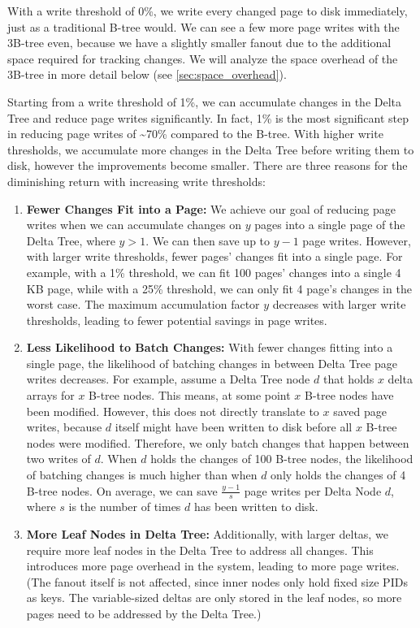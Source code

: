 With a write threshold of 0\%, we write every changed page to disk immediately, just as a traditional B-tree would.
We can see a few more page writes with the 3B-tree even, because we have a slightly smaller fanout due to the additional space required for tracking changes.
We will analyze the space overhead of the 3B-tree in more detail below (see \autoref{sec:space_overhead}).

Starting from a write threshold of 1\%, we can accumulate changes in the Delta Tree and reduce page writes significantly.
In fact, 1\% is the most significant step in reducing page writes of \textasciitilde70\% compared to the B-tree.
With higher write thresholds, we accumulate more changes in the Delta Tree before writing them to disk, however the improvements become smaller.
There are three reasons for the diminishing return with increasing write thresholds:
\begin{enumerate}
\item \textbf{Fewer Changes Fit into a Page:} 
We achieve our goal of reducing page writes when we can accumulate changes on $y$ pages into a single page of the Delta Tree, where $y > 1$.
We can then save up to $y - 1$ page writes.
However, with larger write thresholds, fewer pages' changes fit into a single page.
For example, with a 1\% threshold, we can fit 100 pages' changes into a single 4 KB page, while with a 25\% threshold, we can only fit 4 page's changes in the worst case.
The maximum accumulation factor $y$ decreases with larger write thresholds, leading to fewer potential savings in page writes.
\item \textbf{Less Likelihood to Batch Changes:}
With fewer changes fitting into a single page, the likelihood of batching changes in between Delta Tree page writes decreases.
For example, assume a Delta Tree node $d$ that holds $x$ delta arrays for $x$ B-tree nodes.
This means, at some point $x$ B-tree nodes have been modified. 
However, this does not directly translate to $x$ saved page writes, because $d$ itself might have been written to disk before all $x$ B-tree nodes were modified.
Therefore, we only batch changes that happen between two writes of $d$.
When $d$ holds the changes of 100 B-tree nodes, the likelihood of batching changes is much higher than when $d$ only holds the changes of 4 B-tree nodes.
On average, we can save $\frac{y - 1}{s}$ page writes per Delta Node $d$, where $s$ is the number of times $d$ has been written to disk.
\item \textbf{More Leaf Nodes in Delta Tree:}
Additionally, with larger deltas, we require more leaf nodes in the Delta Tree to address all changes.
This introduces more page overhead in the system, leading to more page writes.
(The fanout itself is not affected, since inner nodes only hold fixed size \ac{PID}s as keys. The variable-sized deltas are only stored in the leaf nodes, so more pages need to be addressed by the Delta Tree.)
\end{enumerate}

